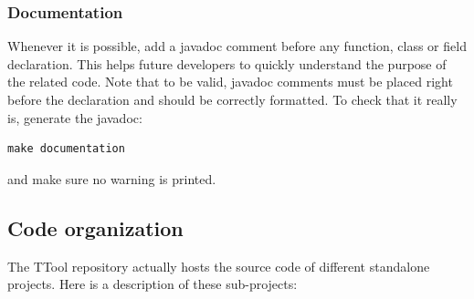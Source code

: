 \documentclass[12pt]{article}
\begin{document}
\subsubsection{Documentation}
Whenever it is possible, add a javadoc comment before any function, class or
field declaration. This helps future developers to quickly understand the
purpose of the related code. Note that to be valid, javadoc comments must be
placed right before the declaration and should be correctly formatted. To check
that it really is, generate the javadoc:
\begin{verbatim}
make documentation
\end{verbatim}
and make sure no warning is printed.

\subsection{Code organization}
\label{sec:code_orga}
The TTool repository actually hosts the source code of different standalone
projects. Here is a description of these sub-projects:
\end{document}

